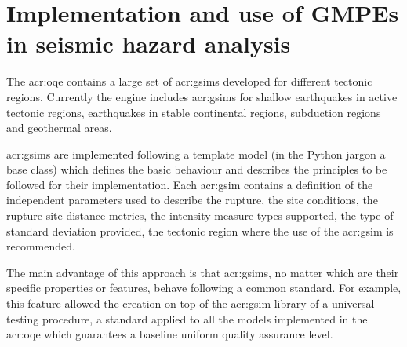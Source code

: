 %
\section{Implementation and use of GMPEs in seismic hazard analysis}
The \gls{acr:oqe} contains a large set of \glspl{acr:gsim}
developed for different tectonic regions. 
%
Currently the engine includes \glspl{acr:gsim} for shallow earthquakes
in active tectonic regions, earthquakes in stable continental regions,
subduction regions and geothermal areas.

\glspl{acr:gsim} are implemented following a template model (in the 
Python jargon a base class) which defines the basic behaviour and 
describes the principles to be followed for their implementation.
%
Each \gls{acr:gsim} contains a definition of the independent parameters
used to describe the rupture, the site conditions, the rupture-site
distance metrics, the intensity measure types supported, the type of 
standard deviation provided, the tectonic region where the use of the 
\gls{acr:gsim} is recommended.

The main advantage of this approach is that \glspl{acr:gsim}, no matter 
which are their specific properties or features, behave following 
a common standard. 
%
For example, this feature allowed the creation on top of the 
\gls{acr:gsim} library of a universal testing procedure, a standard 
applied to all the models implemented in the \gls{acr:oqe} which 
guarantees a baseline uniform quality assurance level. 

